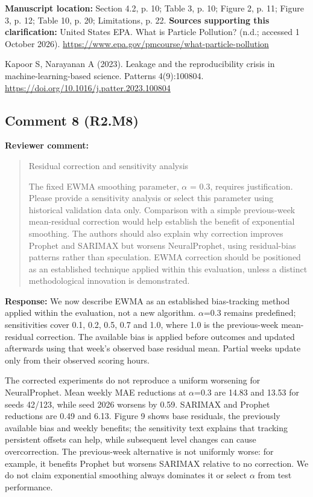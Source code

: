 \documentclass[11pt,a4paper]{article}
\begin{document}
\textbf{Manuscript location:} Section 4.2, p. 10; Table 3, p. 10; Figure 2, p. 11; Figure 3, p. 12; Table 10, p. 20; Limitations, p. 22.
\textbf{Sources supporting this clarification:}
United States EPA. What is Particle Pollution? (n.d.; accessed 1 October 2026). \url{https://www.epa.gov/pmcourse/what-particle-pollution}\par
Kapoor S, Narayanan A (2023). Leakage and the reproducibility crisis in machine-learning-based science. Patterns 4(9):100804. \url{https://doi.org/10.1016/j.patter.2023.100804}\par
\begin{samepage}
\subsection*{Comment 8 (R2.M8)}
\textbf{Reviewer comment:}
\begin{quote}\small Residual correction and sensitivity analysis

The fixed EWMA smoothing parameter, $\alpha$ = 0.3, requires justification. Please provide a sensitivity analysis or select this parameter using historical validation data only. Comparison with a simple previous-week mean-residual correction would help establish the benefit of exponential smoothing. The authors should also explain why correction improves Prophet and SARIMAX but worsens NeuralProphet, using residual-bias patterns rather than speculation. EWMA correction should be positioned as an established technique applied within this evaluation, unless a distinct methodological innovation is demonstrated.\end{quote}
\end{samepage}
\textbf{Response:}
We now describe EWMA as an established bias-tracking method applied within the evaluation, not a new algorithm. $\alpha$=0.3 remains predefined; sensitivities cover 0.1, 0.2, 0.5, 0.7 and 1.0, where 1.0 is the previous-week mean-residual correction. The available bias is applied before outcomes and updated afterwards using that week's observed base residual mean. Partial weeks update only from their observed scoring hours.

The corrected experiments do not reproduce a uniform worsening for NeuralProphet. Mean weekly MAE reductions at $\alpha$=0.3 are 14.83 and 13.53 for seeds 42/123, while seed 2026 worsens by 0.59. SARIMAX and Prophet reductions are 0.49 and 6.13. Figure 9 shows base residuals, the previously available bias and weekly benefits; the sensitivity text explains that tracking persistent offsets can help, while subsequent level changes can cause overcorrection. The previous-week alternative is not uniformly worse: for example, it benefits Prophet but worsens SARIMAX relative to no correction. We do not claim exponential smoothing always dominates it or select $\alpha$ from test performance.
\end{document}
